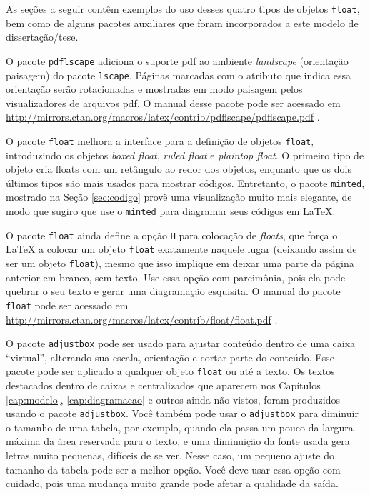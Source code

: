 As seções a seguir contêm exemplos do uso desses quatro tipos de objetos \texttt{float}, bem como de alguns pacotes auxiliares que foram incorporados a este modelo de dissertação/tese.

O pacote \texttt{pdflscape} adiciona o suporte \gls{pdf} ao ambiente \textit{landscape} (orientação paisagem) do pacote \texttt{lscape}. Páginas marcadas com o atributo que indica essa orientação serão rotacionadas e mostradas em modo paisagem pelos visualizadores de arquivos \gls{pdf}. O manual desse pacote pode ser acessado em \url{http://mirrors.ctan.org/macros/latex/contrib/pdflscape/pdflscape.pdf} \parencite{pdflscape}.

O pacote \texttt{float} melhora a interface para a definição de objetos \texttt{float}, introduzindo os objetos \textit{boxed float}, \textit{ruled float} e \textit{plaintop float}. O primeiro tipo de objeto cria floats com um retângulo ao redor dos objetos, enquanto que os dois últimos tipos são mais usados para mostrar códigos. Entretanto, o pacote \texttt{minted}, mostrado na Seção \ref{sec:codigo} provê uma visualização muito mais elegante, de modo que sugiro que use o \texttt{minted} para diagramar seus códigos em \LaTeX{}.

O pacote \texttt{float} ainda define a opção \texttt{H} para colocação de \textit{floats}, que força o \LaTeX{} a colocar um objeto \texttt{float} exatamente naquele lugar (deixando assim de ser um objeto \texttt{float}), mesmo que isso implique em deixar uma parte da página anterior em branco, sem texto. Use essa opção com parcimônia, pois ela pode quebrar o seu texto e gerar uma diagramação esquisita. O manual do pacote \texttt{float} pode ser acessado em \url{http://mirrors.ctan.org/macros/latex/contrib/float/float.pdf} \parencite{float}.

O pacote \texttt{adjustbox} pode ser usado para ajustar conteúdo dentro de uma caixa ``virtual'', alterando sua escala, orientação e cortar parte do conteúdo. Esse pacote pode ser aplicado a qualquer objeto \texttt{float} ou até a texto. Os textos destacados dentro de caixas e centralizados que aparecem nos Capítulos \ref{cap:modelo}, \ref{cap:diagramacao}  e outros ainda não vistos, foram produzidos usando o pacote \texttt{adjustbox}. Você também pode usar o \texttt{adjustbox} para diminuir o tamanho de uma tabela, por exemplo, quando ela passa um pouco da largura máxima da área reservada para o texto, e uma diminuição da fonte usada gera letras muito pequenas, difíceis de se ver. Nesse caso, um pequeno ajuste do tamanho da tabela pode ser a melhor opção. Você deve usar essa opção com cuidado, pois uma mudança muito grande pode afetar a qualidade da saída.

